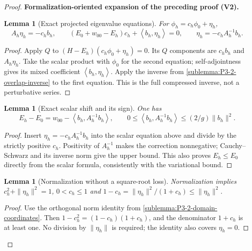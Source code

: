 \documentclass[11pt]{article}
\newtheorem{lemma}[theorem]{Lemma}
\newcommand{\formalisationparentid}{X}
\newenvironment{formalisationaddition}[1]{\par\medskip\begingroup\color{blue}\def\formalisationparentid{#1}\setcounter{formalizationsublemma}{0}\let\lemma\formalizationsublemma\let\endlemma\endformalizationsublemma
  \def\Eo{\mathcal E_h^\circ}\def\EE{\mathcal E_h}\def\phio{\phi_h^\circ}\def\phih{\phi_h}\def\Ho{H_h^{\rm atom}(v^\circ)}\def\Ha{H_h^{\rm atom}}\def\HL{H_h^{L}}\def\Dh{D_h}\def\Log{\operatorname{Log}}\def\ellh{\ell_h}\def\Gp{G_{p,h}}\def\Ast{A_{*,h}}\def\ahat{\widehat{\mathfrak a}_h}\def\ah{\mathfrak a_h}\def\rh{\widehat\rho_h}\def\deltah{\widehat\delta_h}\def\oldref##1{\textup{(##1)}}\def\interface##1{\par\noindent\textit{Analytical interface used here.} ##1\par}\def\finish{\par\noindent\textit{Conclusion of the formalization-oriented expansion.} }\par\noindent\textbf{Formalization-oriented expansion of the preceding proof (V2).}\par\smallskip
}{\par\endgroup\medskip
}
\newcommand{\ip}[2]{\left\langle #1,#2\right\rangle}
\begin{document}
\begin{proof}
\begin{formalisationaddition}{P3.2}
\begin{lemma}[Exact projected eigenvalue equations]\label{sublemma:P3-2-feshbach-algebra}
For $\phih=c_h\phi_0+\eta_h$,
\[
 A_h\eta_h=-c_hb_h,\qquad
 (E_0+w_{00}-E_h)c_h+\ip{b_h}{\eta_h}=0,
 \qquad \eta_h=-c_hA_h^{-1}b_h.
\]
\end{lemma}
\begin{proof}
Apply $Q$ to $(H-E_h)(c_h\phi_0+\eta_h)=0$. Its $Q$ components are
$c_hb_h$ and $A_h\eta_h$. Take the scalar product with $\phi_0$ for the
second equation; self-adjointness gives its mixed coefficient $\ip{b_h}{\eta_h}$.
Apply the inverse from \ref{sublemma:P3-2-overlap-inverse} to the first
equation. This is the full compressed inverse, not a perturbative series.
\end{proof}

\begin{lemma}[Exact scalar shift and its sign]\label{sublemma:P3-2-scalar-shift}
One has
\[
 E_h-E_0=w_{00}-\ip{b_h}{A_h^{-1}b_h},\qquad
 0\le\ip{b_h}{A_h^{-1}b_h}\le(2/g)\|b_h\|^2.
\]
\end{lemma}
\begin{proof}
Insert $\eta_h=-c_hA_h^{-1}b_h$ into the scalar equation above and
divide by the strictly positive $c_h$. Positivity of $A_h^{-1}$ makes
the correction nonnegative; Cauchy--Schwarz and its inverse norm give
the upper bound. This also proves $E_h\le E_0$ directly from the scalar
formula, consistently with the variational bound.
\end{proof}

\begin{lemma}[Normalization without a square-root loss]\label{sublemma:P3-2-normalization}
Normalization implies
$c_h^2+\|\eta_h\|^2=1$, $0<c_h\le1$ and
$1-c_h=\|\eta_h\|^2/(1+c_h)\le\|\eta_h\|^2$.
\end{lemma}
\begin{proof}
Use the orthogonal norm identity from
\ref{sublemma:P3-2-domain-coordinates}. Then
$1-c_h^2=(1-c_h)(1+c_h)$, and the denominator $1+c_h$ is at least one.
No division by $\|\eta_h\|$ is required; the identity also covers
$\eta_h=0$.
\end{proof}


\end{formalisationaddition}
\end{proof}
\end{document}
